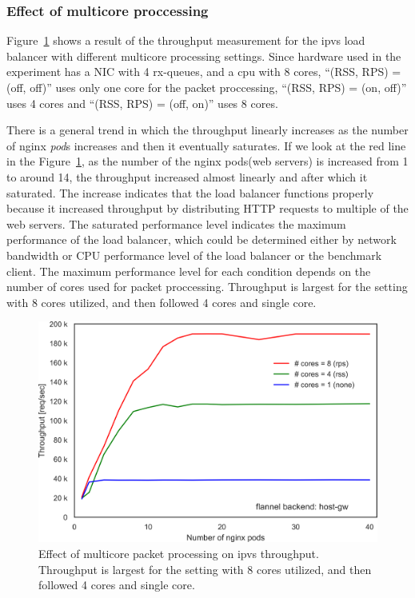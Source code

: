 \FloatBarrier

\subsubsection{Effect of multicore proccessing}

Figure~\ref{fig:ipvs_mcore_proccessing} shows a result of the throughput measurement for the ipvs load balancer with different multicore processing settings.
Since hardware used in the experiment has a NIC with 4 rx-queues, and a cpu with 8 cores,
\enquote{(RSS, RPS) = (off, off)} uses only one core for the packet proccessing,
\enquote{(RSS, RPS) = (on, off)} uses 4 cores and \enquote{(RSS, RPS) = (off, on)} uses 8 cores. 

There is a general trend in which the throughput linearly increases as the number of nginx {\em pod}s increases and then it eventually saturates.
If we look at the red line in the Figure~\ref{fig:ipvs_mcore_proccessing}, as the number of the nginx pods(web servers) is increased from 1 to around 14, the throughput increased almost linearly and after which it saturated.
The increase indicates that the load balancer functions properly because it increased throughput by distributing HTTP requests to multiple of the web servers.
The saturated performance level indicates the maximum performance of the load balancer, which could be determined either by network bandwidth or CPU performance level of the load balancer or the benchmark client.
%
The maximum performance level for each condition depends on the number of cores used for packet proccessing.
Throughput is largest for the setting with 8 cores utilized, and then followed 4 cores and single core.

\begin{figure}[h]
  \centering
  \includegraphics[width=0.9\columnwidth]{Figs/ipvs_mcore_proccessing}

  \centering
  \begin{minipage}{0.9\columnwidth}
    \caption[Effect of multicore packet processing on ipvs throughput]{
      Effect of multicore packet processing on ipvs throughput.
      Throughput is largest for the setting with 8 cores utilized, and then followed 4 cores and single core.
    }
    \label{fig:ipvs_mcore_proccessing}
  \end{minipage}
\end{figure}


